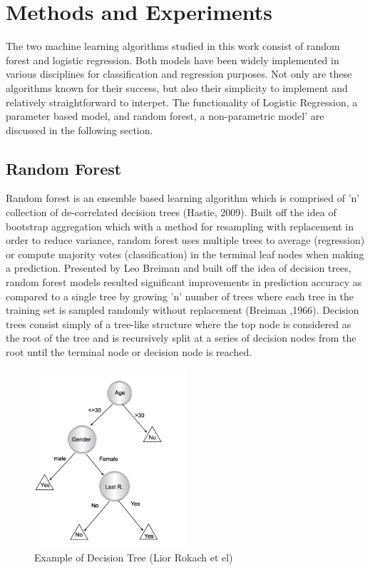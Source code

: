\documentclass{llncs}
\begin{document}
\section{Methods and Experiments}

The two machine learning algorithms studied in this work consist of random forest and logistic regression. Both models have been widely implemented in various disciplines for classification and regression purposes. Not only are these algorithms known for their success, but also their simplicity to implement and relatively straightforward to interpet. The functionality of Logistic Regression, a parameter based model, and random forest, a non-parametric model' are discussed in the following section. 

\subsection{Random Forest}


Random forest is an ensemble based learning algorithm which is comprised of 'n' collection of de-correlated decision trees (Hastie, 2009). Built off the idea of bootstrap aggregation which with a method for resampling with replacement in order to reduce variance, random forest uses multiple trees to average (regression) or compute majority votes (classification) in the terminal leaf nodes when making a prediction. Presented by Leo Breiman and built off the idea of decision trees, random forest models resulted significant improvements in prediction accuracy as compared to a single tree by growing 'n' number of trees where each tree in the training set is sampled randomly without replacement (Breiman ,1966). Decision trees consist simply of a tree-like structure where the top node is considered as the root of the tree and is recursively split at a series of decision nodes from the root until the terminal node or decision node is reached. 


\begin{figure}
\centering
\includegraphics[width=0.5\textwidth]{decisiontree.png}
\caption{Example of Decision Tree (Lior Rokach et el)}
\end{figure}
\end{document}
